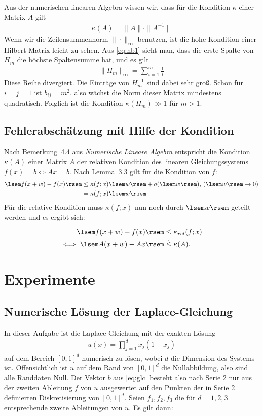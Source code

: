 \documentclass[smallheadings]{scrartcl}
\numberwithin{equation}{section}
\begin{document}
Aus der numerischen linearen Algebra wissen wir, dass für die Kondition $\kappa$ einer Matrix $A$ gilt
\begin{align}
	\kappa(A)=\|A\|\cdot \|A^{-1}\|
	\label{eq:kond}
\end{align}
Wenn wir die Zeilensummennorm $\|\cdot \|_{\infty}$ benutzen, ist die hohe Kondition einer Hilbert-Matrix leicht zu sehen. Aus \ref{eq:hb1}  sieht man, dass die erste Spalte von $H_m$ die höchste Spaltensumme hat, und es gilt
\begin{align}
	\|H_m\|_{\infty}=\sum_{i=1}^{m}\frac{1}{i}
\end{align}
Diese Reihe divergiert. Die Einträge von $H_m^{-1}$ sind dabei sehr groß. Schon für $i=j=1$ ist $b_{ij} = m^2$, also wächst die Norm dieser Matrix mindestens quadratisch. Folglich ist die Kondition $\kappa(H_m)\gg1$ für $m>1$.

\subsection{Fehlerabschätzung mit Hilfe der Kondition}
\label{sec:theo:absch}
Nach Bemerkung~4.4 aus \textit{Numerische Lineare Algebra} entspricht die Kondition $\kappa(A)$ einer Matrix $A$ der relativen Kondition des linearen Gleichungssystems $f(x)=b \iff Ax=b$. Nach Lemma~3.3 gilt für die Kondition von $f$:
\begin{align}
\lsem f(x+w)-f(x)\rsem &\leq \kappa(f;x)\lsem w\rsem + o(\lsem w \rsem)\text{,   } (\lsem w \rsem \rightarrow 0)\\
&\stackrel{.}{=} \kappa(f;x)\lsem w\rsem
\end{align}
Für die relative Kondition muss $\kappa(f;x)$ nun noch durch $\lsem w \rsem$ geteilt werden und es ergibt sich:
\begin{align}
\lsem f(x+w)-f(x)\rsem &\stackrel{.}{\leq} \kappa_{rel}(f;x)\\
\iff  \lsem A (x+w)-Ax\rsem  &\stackrel{.}{\leq} \kappa(A).\label{eq:beschr}
\end{align}


\section{Experimente}

\subsection{Numerische Lösung der Laplace-Gleichung}

In dieser Aufgabe ist die Laplace-Gleichung mit der exakten Lösung 
\begin{align}
u(x)=\prod_{j=1}^{d}x_j(1-x_j) 
\end{align}
auf dem Bereich $[0, 1]^d$ numerisch zu lösen, wobei $d$ die Dimension des Systems ist. Offensichtlich ist $u$ auf dem Rand von $[0, 1]^d$ die Nullabbildung, also sind alle Randdaten Null. Der Vektor $b$ aus \ref{eq:glc} besteht also nach Serie 2 nur aus der zweiten Ableitung $f$ von $u$ ausgewertet auf den Punkten der in Serie 2 definierten Diskretisierung von $[0, 1]^d$. Seien $f_1, f_2, f_3$ die für $d=1, 2, 3$ entsprechende zweite Ableitungen von $u$. Es gilt dann:
\end{document}
